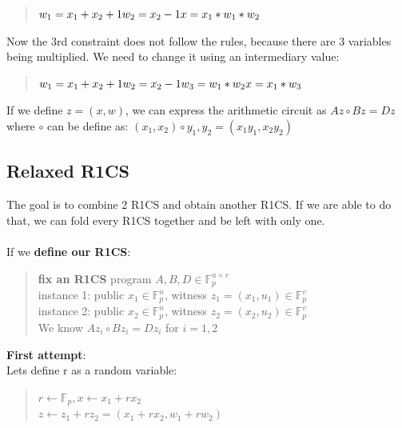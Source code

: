    \begin{quote}
   $w_1 = x_1+x_2+1
   \\
   w_2 = x_2 -1
   \\
   x = x_1*w_1*w_2$
   \end{quote}


   Now the 3rd constraint does not follow the rules, because there are 3 variables being multiplied.
   We need to change it using an intermediary value:
  
   \begin{quote}
   $w_1 = x_1+x_2+1
   \\
   w_2 = x_2 -1
   \\
   w_3 = w_1*w_2
   \\
   x = x_1*w_3$
   \end{quote}
   \cite{ZKM3}


   If we define $z=(x,w)$, we can express the arithmetic circuit as $ Az \circ Bz = Dz$
   where $\circ$ can be define as: $(x_1, x_2) \circ y_1, y_2 = (x_1y_1, x_2y_2)$
\cite{ZKM10}


\subsection{Relaxed R1CS}
The goal is to combine 2 R1CS and obtain another R1CS. If we are able to do that, we can fold every R1CS together and be left with only one.
\\
\\
If we \textbf{define our R1CS}:
\begin{quote}
\textbf{fix an R1CS} program $A,B,D \in \mathbb{F}^{u \times v}_p $
\\
instance 1: public $ x_1 \in \mathbb{F}^n_p $, witness $ z_1 = (x_1, u_1) \in \mathbb{F}^v_p$
\\
instance 2: public $x_2 \in \mathbb{F}^n_p $, witness $ z_2 = (x_2, u_2) \in \mathbb{F}^v_p$
\\
We know $Az_i \circ Bz_i = Dz_i$ for $ i = 1,2$
\end{quote}


\textbf{First attempt}:
\\
Lets define r as a random variable:
\begin{quote}
$r \leftarrow \mathbb{F}_p, x \leftarrow x_1+rx_2$
\\
$z \leftarrow z_1 + rz_2 = (x_1+rx_2, w_1 + rw_2)$
\end{quote}


